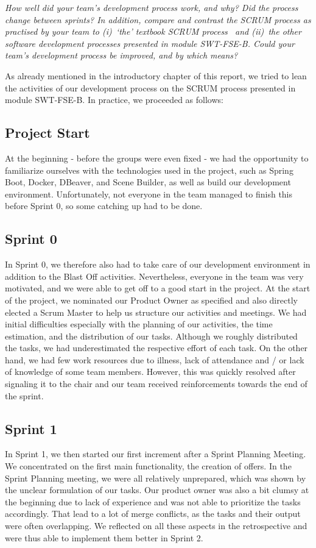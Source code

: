\emph{How well did your team's development process work, and why? Did the process change between sprints?  In addition,
    compare and contrast the SCRUM process as practised by your team to (i)~`the' textbook SCRUM process~\cite{scrumbook}
    and (ii)~the other software development processes presented in module SWT-FSE-B.
    Could your team's development process be improved, and by which means?}

As already mentioned in the introductory chapter of this report, we tried to lean the activities of our development process on the SCRUM process presented in module SWT-FSE-B.
In practice, we proceeded as follows:


\subsection{Project Start}
At the beginning - before the groups were even fixed - we had the opportunity to familiarize ourselves with the technologies used in the project, such as Spring Boot, Docker, DBeaver, and Scene Builder, as well as build our development environment.
Unfortunately, not everyone in the team managed to finish this before Sprint 0, so some catching up had to be done.

\subsection{Sprint 0}
In Sprint 0, we therefore also had to take care of our development environment in addition to the Blast Off activities.
Nevertheless, everyone in the team was very motivated, and we were able to get off to a good start in the project.
At the start of the project, we nominated our Product Owner as specified and also directly elected a Scrum Master to help us structure our activities and meetings.
We had initial difficulties especially with the planning of our activities, the time estimation, and the distribution of our tasks.
Although we roughly distributed the tasks, we had underestimated the respective effort of each task.
On the other hand, we had few work resources due to illness, lack of attendance and / or lack of knowledge of some team members.
However, this was quickly resolved after signaling it to the chair and our team received reinforcements towards the end of the sprint.

\subsection{Sprint 1}
In Sprint 1, we then started our first increment after a Sprint Planning Meeting.
We concentrated on the first main functionality, the creation of offers.
In the Sprint Planning meeting, we were all relatively unprepared, which was shown by the unclear formulation of our tasks.
Our product owner was also a bit clumsy at the beginning due to lack of experience and was not able to prioritize the tasks accordingly.
That lead to a lot of merge conflicts, as the tasks and their output were often overlapping.
We reflected on all these aspects in the retrospective and were thus able to implement them better in Sprint 2.

